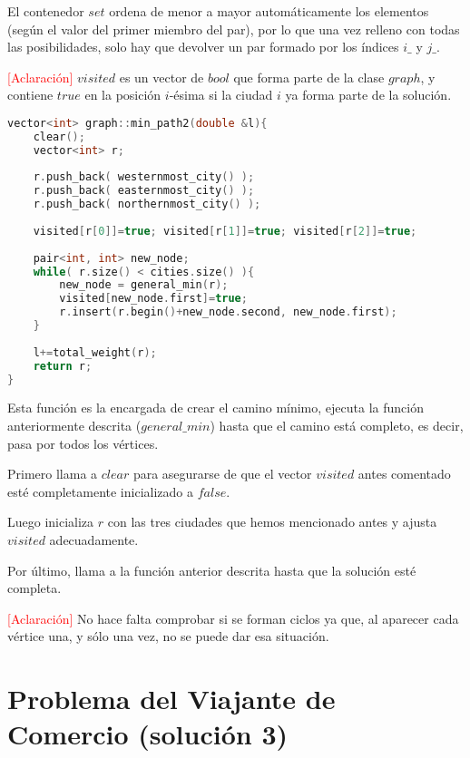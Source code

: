 \documentclass[11pt]{article}
\begin{document}
El contenedor $set$ ordena de menor a mayor automáticamente los elementos (según el valor del primer miembro del par), por lo que una vez relleno con todas las posibilidades, solo hay que devolver un par formado por los índices $i\_$ y $j\_$.

\textcolor{red}{[Aclaración]} $visited$ es un vector de $bool$ que forma parte de la clase $graph$, y contiene $true$ en la posición $i$-ésima si la ciudad $i$ ya forma parte de la solución.

\begin{lstlisting}[language=C++, caption=min\_path2]
vector<int> graph::min_path2(double &l){
	clear();
	vector<int> r;
	
	r.push_back( westernmost_city() );
	r.push_back( easternmost_city() );
	r.push_back( northernmost_city() );
	
	visited[r[0]]=true; visited[r[1]]=true; visited[r[2]]=true;
	
	pair<int, int> new_node;
	while( r.size() < cities.size() ){
		new_node = general_min(r);
		visited[new_node.first]=true;
		r.insert(r.begin()+new_node.second, new_node.first);    
	}
	
	l+=total_weight(r);
	return r;      
}
\end{lstlisting}

Esta función es la encargada de crear el camino mínimo, ejecuta la función anteriormente descrita ($general\_min$) hasta que el camino está completo, es decir, pasa por todos los vértices.

Primero llama a $clear$ para asegurarse de que el vector $visited$ antes comentado esté completamente inicializado a $false$.

Luego inicializa $r$ con las tres ciudades que hemos mencionado antes y ajusta $visited$ adecuadamente.

Por último, llama a la función anterior descrita hasta que la solución esté completa.

\textcolor{red}{[Aclaración]} No hace falta comprobar si se forman ciclos ya que, al aparecer cada vértice una, y sólo una vez, no se puede dar esa situación.

\section{Problema del Viajante de Comercio (solución 3)}
\end{document}

